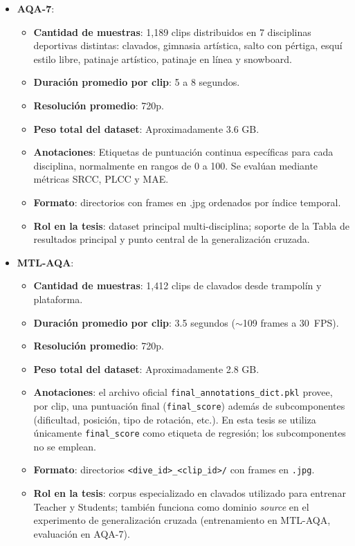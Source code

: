 \begin{itemize}
    \item \textbf{AQA-7}:
        \begin{itemize}
            \item \textbf{Cantidad de muestras}: 1,189 clips distribuidos en 7 disciplinas deportivas distintas: clavados, gimnasia artística, salto con pértiga, esquí estilo libre, patinaje artístico, patinaje en línea y snowboard.
            \item \textbf{Duración promedio por clip}: 5 a 8 segundos.
            \item \textbf{Resolución promedio}: 720p.
            \item \textbf{Peso total del dataset}: Aproximadamente 3.6 GB.
            \item \textbf{Anotaciones}: Etiquetas de puntuación continua específicas para cada disciplina, normalmente en rangos de 0 a 100. Se evalúan mediante métricas SRCC, PLCC y MAE.
            \item \textbf{Formato}: directorios con frames en .jpg ordenados por índice temporal.
            \item \textbf{Rol en la tesis}: dataset principal multi-disciplina; soporte de la Tabla de resultados principal y punto central de la generalización cruzada.
        \end{itemize}

    \item \textbf{MTL-AQA}:
        \begin{itemize}
            \item \textbf{Cantidad de muestras}: 1{,}412 clips de clavados desde trampolín y plataforma.
            \item \textbf{Duración promedio por clip}: 3.5 segundos ($\sim$109 frames a 30~FPS).
            \item \textbf{Resolución promedio}: 720p.
            \item \textbf{Peso total del dataset}: Aproximadamente 2.8 GB.
            \item \textbf{Anotaciones}: el archivo oficial \texttt{final\_annotations\_dict.pkl} provee, por clip, una puntuación final (\texttt{final\_score}) además de subcomponentes (dificultad, posición, tipo de rotación, etc.). En esta tesis se utiliza únicamente \texttt{final\_score} como etiqueta de regresión; los subcomponentes no se emplean.
            \item \textbf{Formato}: directorios \texttt{<dive\_id>\_<clip\_id>/} con frames en \texttt{.jpg}.
            \item \textbf{Rol en la tesis}: corpus especializado en clavados utilizado para entrenar Teacher y Students; también funciona como dominio \textit{source} en el experimento de generalización cruzada (entrenamiento en MTL-AQA, evaluación en AQA-7).
        \end{itemize}


\end{itemize}
